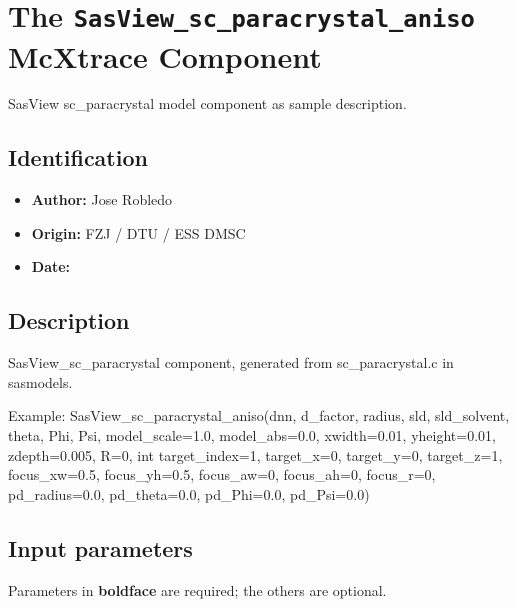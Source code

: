 \section{The \texttt{SasView\_sc\_paracrystal\_aniso} McXtrace Component}
SasView sc\_paracrystal model component as sample description.

\subsection*{Identification}
\begin{itemize}
  \item \textbf{Author:} Jose Robledo
  \item \textbf{Origin:} FZJ / DTU / ESS DMSC
  \item \textbf{Date:} 
\end{itemize}

\subsection*{Description}
SasView\_sc\_paracrystal component, generated from sc\_paracrystal.c in sasmodels.

Example: SasView\_sc\_paracrystal\_aniso(dnn, d\_factor, radius, sld, sld\_solvent, theta, Phi, Psi, model\_scale=1.0, model\_abs=0.0, xwidth=0.01, yheight=0.01, zdepth=0.005, R=0, int target\_index=1, target\_x=0, target\_y=0, target\_z=1, focus\_xw=0.5, focus\_yh=0.5, focus\_aw=0, focus\_ah=0, focus\_r=0, pd\_radius=0.0, pd\_theta=0.0, pd\_Phi=0.0, pd\_Psi=0.0)

\subsection*{Input parameters}
Parameters in \textbf{boldface} are required; the others are optional.

